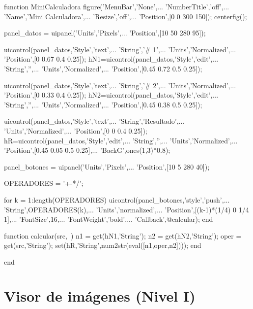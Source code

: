 \begin{matlab}
function MiniCalculadora
figure('MenuBar','None',...
    'NumberTitle','off',...
    'Name','Mini Calculadora',...
    'Resize','off',...
    'Position',[0 0 300 150]);
centerfig();
 
panel_datos = uipanel('Units','Pixels',...
    'Position',[10 50 280 95]);
 
uicontrol(panel_datos,'Style','text',...
    'String','# 1',...
    'Units','Normalized',...
    'Position',[0 0.67 0.4 0.25]);
hN1=uicontrol(panel_datos,'Style','edit',...
    'String','',...
    'Units','Normalized',...
    'Position',[0.45 0.72 0.5 0.25]);
 
uicontrol(panel_datos,'Style','text',...
    'String','# 2',...
    'Units','Normalized',...
    'Position',[0 0.33 0.4 0.25]);
hN2=uicontrol(panel_datos,'Style','edit',...
    'String','',...
    'Units','Normalized',...
    'Position',[0.45 0.38 0.5 0.25]);
 
uicontrol(panel_datos,'Style','text',...
    'String','Resultado',...
    'Units','Normalized',...
    'Position',[0 0 0.4 0.25]);
hR=uicontrol(panel_datos,'Style','edit',...
    'String','',...
    'Units','Normalized',...
    'Position',[0.45 0.05 0.5 0.25],...
    'BackG',ones(1,3)*0.8);
 
panel_botones = uipanel('Units','Pixels',...
    'Position',[10 5 280 40]);
 
OPERADORES = '+-*/';
 
for k = 1:length(OPERADORES)
    uicontrol(panel_botones,'style','push',...
        'String',OPERADORES(k),...
        'Units','normalized',...
        'Position',[(k-1)*(1/4) 0 1/4 1],...
        'FontSize',16,...
        'FontWeight','bold',...
        'Callback',@calcular);
end
 
    function calcular(src,~)
        n1 = get(hN1,'String'); %
        n2 = get(hN2,'String'); %
        oper = get(src,'String'); %
        set(hR,'String',num2str(eval([n1,oper,n2])));
    end
 
end
\end{matlab}

\section{Visor de imágenes (Nivel I)}


